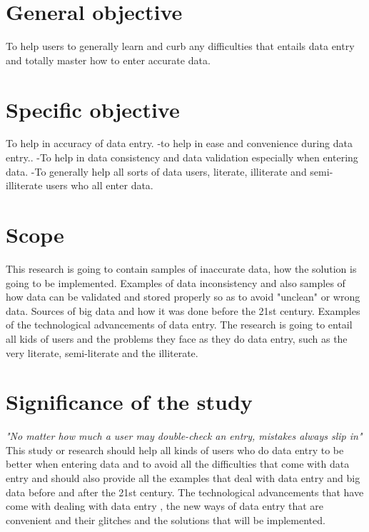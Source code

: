 \documentclass[12pt,]{article}
\begin{document}
\section{
\textbf{General objective}}
To help users to generally learn and curb any difficulties that entails data entry and totally master how to enter accurate data.

\section{
\textbf{Specific objective}}
To help in accuracy of data entry.
-to help in ease and convenience during data entry..
-To help in data consistency and data validation especially when entering data.
-To generally help all sorts of data users, literate, illiterate and semi- illiterate users who all enter data.

\section{
\textbf{Scope}}
This research is going to contain samples of inaccurate data, how the solution is going to be implemented. Examples of data inconsistency and also samples of how data can be validated and stored properly so as to avoid "unclean" or wrong data. Sources of big data and how it was done before the 21st century. Examples of the technological advancements of data entry. The research is going to entail all kids of users and the problems they face as they do data entry, such as the very literate, semi-literate and the illiterate.
  
\section{
\textbf{Significance of the study}}
\textit{"No matter how much a user may double-check an entry, mistakes always slip in"}
This study or research should help all kinds of users who do data entry to be better when entering data and to avoid all the difficulties that come with data entry and should also provide all the examples that deal with data entry and big data  before and after the 21st century. The technological advancements that have come with dealing with data entry , the new ways of data entry that are convenient and their glitches and the solutions that will be implemented.
\end{document}
